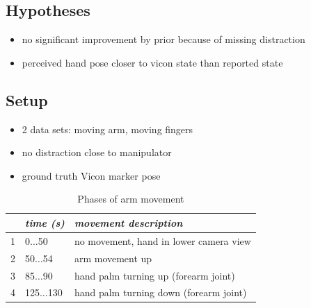 

\subsection{Hypotheses}



\begin{itemize}
\item no significant improvement by prior because of missing distraction
\item perceived hand pose closer to vicon state than reported state
\end{itemize}


\subsection{Setup}



\begin{itemize}
\item 2 data sets: moving arm, moving fingers
\item no distraction close to manipulator
\item ground truth Vicon marker pose
\end{itemize}

\begin{table}
\centering
\begin{tabular}{|c|l|l|}
\hline
 & \emph{time (s)} & \emph{movement description} \\
\hline
1 & 0$\dots$50 & no movement, hand in lower camera view \\
\hline
2 & 50$\dots$54 & arm movement up \\
\hline
3 & 85$\dots$90 & hand palm turning up (forearm joint) \\
\hline
4 & 125$\dots$130 & hand palm turning down (forearm joint) \\
\hline
\end{tabular}
\caption{Phases of arm movement}
\label{tab:vic_arm_movement_phases}
\end{table}

